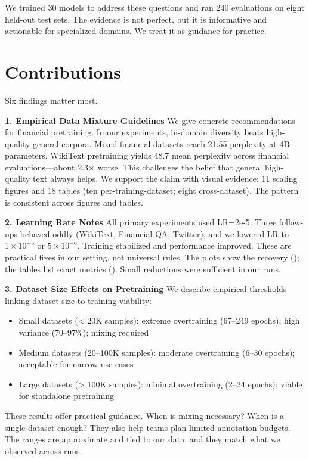 We trained 30 models to address these questions and ran 240 evaluations on eight held-out test sets. The evidence is not perfect, but it is informative and actionable for specialized domains. We treat it as guidance for practice.

\section{Contributions}

Six findings matter most.

\textbf{1. Empirical Data Mixture Guidelines}
We give concrete recommendations for financial pretraining. In our experiments, in-domain diversity beats high-quality general corpora. Mixed financial datasets reach 21.55 perplexity at 4B parameters. WikiText pretraining yields 48.7 mean perplexity across financial evaluations—about 2.3$\times$ worse. This challenges the belief that general high-quality text always helps. We support the claim with visual evidence: 11 scaling figures and 18 tables (ten per-training-dataset; eight cross-dataset). The pattern is consistent across figures and tables.

\textbf{2. Learning Rate Notes}
All primary experiments used LR=2e-5. Three follow-ups behaved oddly (WikiText, Financial QA, Twitter), and we lowered LR to $1\times10^{-5}$ or $5\times10^{-6}$. Training stabilized and performance improved. These are practical fixes in our setting, not universal rules. The plots show the recovery (); the tables list exact metrics (). Small reductions were sufficient in our runs.

\textbf{3. Dataset Size Effects on Pretraining}
We describe empirical thresholds linking dataset size to training viability:
\begin{itemize}
    \item Small datasets (< 20K samples): extreme overtraining (67--249 epochs), high variance (70--97\%); mixing required
    \item Medium datasets (20--100K samples): moderate overtraining (6--30 epochs); acceptable for narrow use cases
    \item Large datasets (> 100K samples): minimal overtraining (2--24 epochs); viable for standalone pretraining
\end{itemize}
These results offer practical guidance. When is mixing necessary? When is a single dataset enough? They also help teams plan limited annotation budgets. The ranges are approximate and tied to our data, and they match what we observed across runs.


